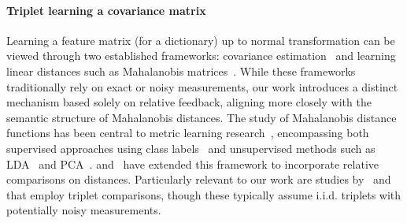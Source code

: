 \paragraph{Triplet learning a covariance matrix}
Learning a feature matrix (for a dictionary) up to normal transformation can be viewed through two established frameworks: covariance estimation~\citep{Chen2013ExactAS,voroninski} and learning linear distances such as Mahalanobis matrices~\citep{kulis_ml}. While these frameworks traditionally rely on exact or noisy measurements, our work introduces a distinct mechanism based solely on relative feedback, aligning more closely with the semantic structure of Mahalanobis distances.
The study of Mahalanobis distance functions has been central to metric learning research~\citep{bellet_survey,kulis_ml}, encompassing both supervised approaches using class labels~\citep{LMNN,Xing2002DistanceML} and unsupervised methods such as LDA~\citep{LDA} and PCA~\citep{PCA}. \citet{distance_metric_relative} and~\citet{Kleindessner2016KernelFB} have extended this framework to incorporate relative comparisons on distances. Particularly relevant to our work are studies by~\citet{distance_metric_relative} and~\citet{Mason2017LearningLM} that employ triplet comparisons, though these typically assume i.i.d. triplets with potentially noisy measurements.

